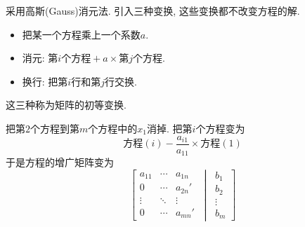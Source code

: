 采用高斯(Gauss)消元法. 引入三种变换, 这些变换都不改变方程的解.
\begin{itemize}
  \item 把某一个方程乘上一个系数$a$.
  \item 消元: $\text{第$i$个方程} + a \times \text{第$j$个方程}$.
  \item 换行: 把第$i$行和第$j$行交换.
\end{itemize}
这三种称为矩阵的初等变换.

把第$2$个方程到第$m$个方程中的$x_1$消掉. 把第$i$个方程变为
\begin{equation}
  \text{方程}(i) - \frac{a_{i 1}}{a_{11}} \times \text{方程}(1)
\end{equation}
于是方程的增广矩阵变为
\begin{equation}
  \left[
    \begin{matrix}
        a_{11}&\cdots&a_{1n}\\
        0&\cdots&a_{2n}'\\
        \vdots&\ddots&\vdots\\
        0&\cdots&a_{m n}'
    \end{matrix}
    \ 
  \middle|
    \ 
    \begin{matrix} 
    b_1 \\ 
    b_2 \\ 
    \vdots \\ 
    b_m
    \end{matrix}
  \right] 
\end{equation}